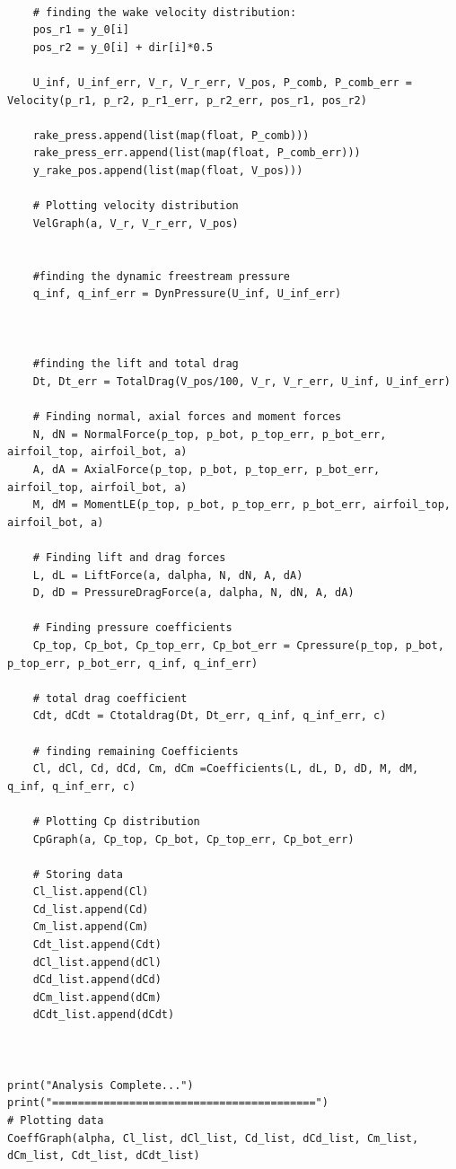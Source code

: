 \documentclass[11pt, letterpaper]{article}
\begin{document}
\begin{appendices}
\begin{verbatim}
    
    # finding the wake velocity distribution:
    pos_r1 = y_0[i]
    pos_r2 = y_0[i] + dir[i]*0.5
    
    U_inf, U_inf_err, V_r, V_r_err, V_pos, P_comb, P_comb_err = Velocity(p_r1, p_r2, p_r1_err, p_r2_err, pos_r1, pos_r2)

    rake_press.append(list(map(float, P_comb)))
    rake_press_err.append(list(map(float, P_comb_err)))
    y_rake_pos.append(list(map(float, V_pos)))

    # Plotting velocity distribution
    VelGraph(a, V_r, V_r_err, V_pos)


    #finding the dynamic freestream pressure
    q_inf, q_inf_err = DynPressure(U_inf, U_inf_err)



    #finding the lift and total drag
    Dt, Dt_err = TotalDrag(V_pos/100, V_r, V_r_err, U_inf, U_inf_err)

    # Finding normal, axial forces and moment forces
    N, dN = NormalForce(p_top, p_bot, p_top_err, p_bot_err, airfoil_top, airfoil_bot, a)
    A, dA = AxialForce(p_top, p_bot, p_top_err, p_bot_err, airfoil_top, airfoil_bot, a)
    M, dM = MomentLE(p_top, p_bot, p_top_err, p_bot_err, airfoil_top, airfoil_bot, a)

    # Finding lift and drag forces
    L, dL = LiftForce(a, dalpha, N, dN, A, dA)
    D, dD = PressureDragForce(a, dalpha, N, dN, A, dA)

    # Finding pressure coefficients
    Cp_top, Cp_bot, Cp_top_err, Cp_bot_err = Cpressure(p_top, p_bot, p_top_err, p_bot_err, q_inf, q_inf_err)

    # total drag coefficient
    Cdt, dCdt = Ctotaldrag(Dt, Dt_err, q_inf, q_inf_err, c)

    # finding remaining Coefficients
    Cl, dCl, Cd, dCd, Cm, dCm =Coefficients(L, dL, D, dD, M, dM, q_inf, q_inf_err, c)

    # Plotting Cp distribution
    CpGraph(a, Cp_top, Cp_bot, Cp_top_err, Cp_bot_err)

    # Storing data
    Cl_list.append(Cl)
    Cd_list.append(Cd)
    Cm_list.append(Cm)
    Cdt_list.append(Cdt)
    dCl_list.append(dCl)
    dCd_list.append(dCd)
    dCm_list.append(dCm)
    dCdt_list.append(dCdt)



print("Analysis Complete...")
print("=========================================")
# Plotting data
CoeffGraph(alpha, Cl_list, dCl_list, Cd_list, dCd_list, Cm_list, dCm_list, Cdt_list, dCdt_list)


\end{verbatim}
\end{appendices}
\end{document}
